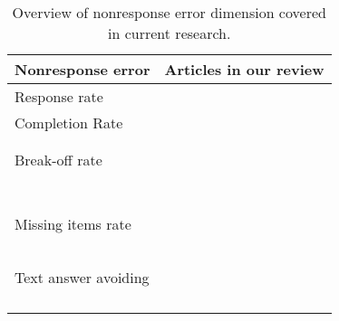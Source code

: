 \begin{table}
    \centering
	\begin{tabular}{ll}
		\toprule
		Nonresponse error & Articles in our review\\
		\midrule
		Response rate & \cite{lambert_living_2015, tourangeau_web_2018}\\
        Completion Rate & \cite{ha_are_2019, ha_data_2020}\\
    	& \cite{mavletova_data_2013, mavletova_grid_2018}\\
    	& \cite{ buskirk_making_2014, mavletova_sensitive_2013}\\
        Break-off rate & \cite{erens_comparing_2019, mavletova_data_2013}\\
    	& \cite{hartman_does_2019, liebe_does_2015}\\
    	& \cite{lee_experimental_2019, mavletova_grid_2018}\\
    	& \cite{lambert_living_2015, bosch_measurement_2019}\\
    	& \cite{schlosser_mobile_2018, brosnan_pc_2017}\\
    	& \cite{mavletova_sensitive_2013, keusch_web_2017}\\
    	& \cite{toepoel_what_2014, steinbrecher_why_2015}\\
    	& \cite{couper_why_2017}\\
        Missing items rate & \cite{revilla_are_2017, erens_comparing_2019}\\
    	& \cite{revilla_comparing_2018, lee_experimental_2019}\\
    	& \cite{buskirk_making_2014, daikeler_motivated_2020}\\
    	& \cite{toepoel_sliders_2018, struminskaya_effects_2015}\\
    	& \cite{lugtig_use_2016, tourangeau_web_2018}\\
    	& \cite{keusch_web_2017}\\
    	Text answer avoiding & \cite{erens_comparing_2019, wells_comparison_2014}\\
    	& \cite{ha_data_2020, antoun_effects_2017}\\
    	& \cite{de_bruijne_improving_2014, schlosser_mobile_2018}\\
    	& \cite{revilla_open_2016, struminskaya_effects_2015}\\
    	& \cite{toepoel_what_2014}\\
    	\bottomrule
    \end{tabular}
	\caption{Overview of nonresponse error dimension covered in current research.}
	\label{tab: nonresponse}
\end{table}


